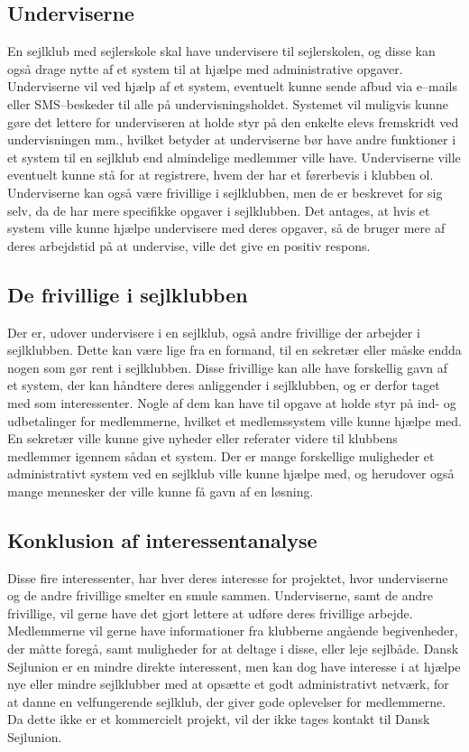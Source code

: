 \subsection{Underviserne}

En sejlklub med sejlerskole skal have undervisere til sejlerskolen, og disse kan også drage nytte af et system til at hjælpe med administrative opgaver. 
Underviserne vil ved hjælp af et system, eventuelt kunne sende afbud via e--mails eller SMS--beskeder til alle på undervisningsholdet. 
Systemet vil muligvis kunne gøre det lettere for underviseren at holde styr på den enkelte elevs fremskridt ved undervisningen mm., hvilket betyder at underviserne bør have andre funktioner i et system til en sejlklub end almindelige medlemmer ville have.
Underviserne ville eventuelt kunne stå for at registrere, hvem der har et førerbevis i klubben ol.
Underviserne kan også være frivillige i sejlklubben, men de er beskrevet for sig selv, da de har mere specifikke opgaver i sejlklubben.
Det antages, at hvis et system ville kunne hjælpe undervisere med deres opgaver, så de bruger mere af deres arbejdstid på at undervise, ville det give en positiv respons.


\subsection{De frivillige i sejlklubben}

Der er, udover undervisere i en sejlklub, også andre frivillige der arbejder i sejlklubben.
Dette kan være lige fra en formand, til en sekretær eller måske endda nogen som gør rent i sejlklubben. 
Disse frivillige kan alle have forskellig gavn af et system, der kan håndtere deres anliggender i sejlklubben, og er derfor taget med som interessenter. 
Nogle af dem kan have til opgave at holde styr på ind- og udbetalinger for medlemmerne, hvilket et medlemssystem ville kunne hjælpe med. 
En sekretær ville kunne give nyheder eller referater videre til klubbens medlemmer igennem sådan et system. 
Der er mange forskellige muligheder et administrativt system ved en sejlklub ville kunne hjælpe med, og herudover også mange mennesker der ville kunne få gavn af en løsning.


\subsection{Konklusion af interessentanalyse}

Disse fire interessenter, har hver deres interesse for projektet, hvor underviserne og de andre frivillige smelter en smule sammen. 
Underviserne, samt de andre frivillige, vil gerne have det gjort lettere at udføre deres frivillige arbejde.
Medlemmerne vil gerne have informationer fra klubberne angående begivenheder, der måtte foregå, samt muligheder for at deltage i disse, eller leje sejlbåde.
Dansk Sejlunion er en mindre direkte interessent, men kan dog have interesse i at hjælpe nye eller mindre sejlklubber med at opsætte et godt administrativt netværk, for at danne en velfungerende sejlklub, der giver gode oplevelser for medlemmerne.
Da dette ikke er et kommercielt projekt, vil der ikke tages kontakt til Dansk Sejlunion.
